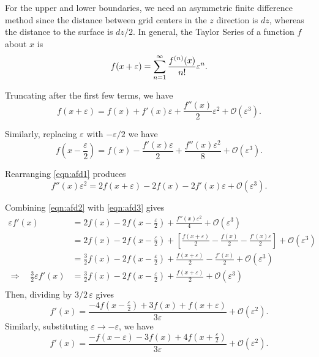 \documentclass[ms,cpyr,lof,lot]{uathesis}
\begin{document}
For the upper and lower boundaries, we need an asymmetric finite difference
method since the distance between grid centers in the $z$ direction is $dz$, whereas the distance to the surface is $dz/2$.
In general, the Taylor Series of a function $f$ about $x$ is
\begin{equation*}
  f(x+\varepsilon) = \sum_{n=1}^\infty \frac{f^{(n)}(x)}{n!} \varepsilon^n. \\
\end{equation*}

Truncating after the first few terms, we have
\begin{equation}
  \label{eqn:afd1}
  f(x+\varepsilon)  = f(x) + f'(x)\varepsilon + \frac{f''(x)}{2}\varepsilon^2 + \mathcal{O}(\varepsilon^3).
\end{equation}

Similarly, replacing $\varepsilon$ with $-\varepsilon/2$ we have
\begin{equation}
  \label{eqn:afd2}
  f(x-\frac{\varepsilon}{2}) = f(x) - \frac{f'(x)\varepsilon}{2} + \frac{f''(x)\varepsilon^2}{8} + \mathcal{O}(\varepsilon^3).
\end{equation}

Rearranging \eqref{eqn:afd1} produces
\begin{equation}
  \label{eqn:afd3}
  f''(x)\varepsilon^2 = 2f(x+\varepsilon) - 2f(x) - 2f'(x)\varepsilon + \mathcal{O}(\varepsilon^3).
\end{equation}

Combining \eqref{eqn:afd2} with \eqref{eqn:afd3} gives
\begin{align*}
  \varepsilon f'(x) &= 2f(x) - 2f(x-\frac{\varepsilon}{2}) + \frac{f''(x)\varepsilon^2}{4} + \mathcal{O}(\varepsilon^3) \\
  &= 2f(x) - 2f(x-\frac{\varepsilon}{2}) + \left[ \frac{f(x+\varepsilon)}{2} - \frac{f(x)}{2} - \frac{f'(x)\varepsilon}{2} \right] + \mathcal{O}(\varepsilon^3) \\
  &= \frac{3}{2}f(x) - 2f(x-\frac{\varepsilon}{2}) + \frac{f(x+\varepsilon)}{2} - \frac{f'(x)}{2} + \mathcal{O}(\varepsilon^3) \\
 \Rightarrow \quad \frac{3}{2}\varepsilon f'(x) &= \frac{3}{2}f(x) - 2f(x-\frac{\varepsilon}{2}) + \frac{f(x+\varepsilon)}{2} + \mathcal{O}(\varepsilon^3) \\
\end{align*}
Then, dividing by $3/2\, \varepsilon$ gives
\begin{equation}
  f'(x) = \frac{-4f(x-\frac{\varepsilon}{2}) + 3f(x) + f(x+\varepsilon)}{3\varepsilon} + \mathcal{O}(\varepsilon^2).
\end{equation}
Similarly, substituting $\varepsilon \to -\varepsilon$, we have
\begin{equation}
  f'(x) = \frac{- f(x-\varepsilon) - 3f(x) + 4f(x+\frac{\varepsilon}{2})}{3\varepsilon} + \mathcal{O}(\varepsilon^2).
\end{equation}
\end{document}
